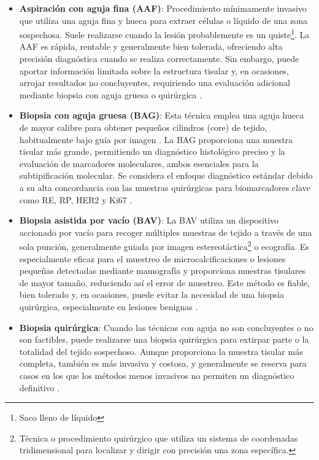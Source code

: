 \documentclass[a4paper,10pt]{book}
\begin{document}
\begin{itemize}
    \item \textbf{Aspiración con aguja fina (AAF)}: Procedimiento mínimamente invasivo que utiliza una aguja fina y hueca para extraer células o líquido de una zona sospechosa. Suele realizarse cuando la lesión probablemente es un quiste\footnote{Saco lleno de líquido}. La AAF es rápida, rentable y generalmente bien tolerada, ofreciendo alta precisión diagnóstica cuando se realiza correctamente. Sin embargo, puede aportar información limitada sobre la estructura tisular y, en ocasiones, arrojar resultados no concluyentes, requiriendo una evaluación adicional mediante biopsia con aguja gruesa o quirúrgica \cite{noauthor_fine_nodate, silva_breast_2023}.
    
    \item \textbf{Biopsia con aguja gruesa (BAG)}: Esta técnica emplea una aguja hueca de mayor calibre para obtener pequeños cilindros (core) de tejido, habitualmente bajo guía por imagen \cite{CoreNeedleBiopsy, silva_breast_2023}. La BAG proporciona una muestra tisular más grande, permitiendo un diagnóstico histológico preciso y la evaluación de marcadores moleculares, ambos esenciales para la subtipificación molecular. Se considera el enfoque diagnóstico estándar debido a su alta concordancia con las muestras quirúrgicas para biomarcadores clave como RE, RP, HER2 y Ki67 \cite{jeong_analysis_2020}.
    
    \item \textbf{Biopsia asistida por vacío (BAV)}: La BAV utiliza un dispositivo accionado por vacío para recoger múltiples muestras de tejido a través de una sola punción, generalmente guiada por imagen estereotáctica\footnote{Técnica o procedimiento quirúrgico que utiliza un sistema de coordenadas tridimensional para localizar y dirigir con precisión una zona específica.} o ecografía. Es especialmente eficaz para el muestreo de microcalcificaciones o lesiones pequeñas detectadas mediante mamografía y proporciona muestras tisulares de mayor tamaño, reduciendo así el error de muestreo. Este método es fiable, bien tolerado y, en ocasiones, puede evitar la necesidad de una biopsia quirúrgica, especialmente en lesiones benignas \cite{park_vacuum-assisted_2014}.
    
    \item \textbf{Biopsia quirúrgica}: Cuando las técnicas con aguja no son concluyentes o no son factibles, puede realizarse una biopsia quirúrgica para extirpar parte o la totalidad del tejido sospechoso. Aunque proporciona la muestra tisular más completa, también es más invasiva y costosa, y generalmente se reserva para casos en los que los métodos menos invasivos no permiten un diagnóstico definitivo \cite{silva_breast_2023}.
\end{itemize}
\end{document}

